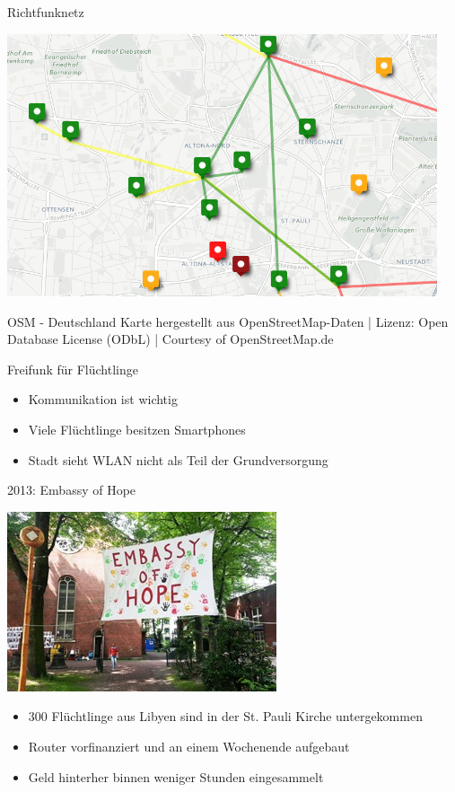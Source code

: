 \documentclass[t]{beamer}
\begin{document}
  \begin{frame}{Richtfunknetz}
    \begin{center}
      \includegraphics[width=0.95\textwidth]{Bilder/richtfunk-uebersicht}
    \end{center}
    \tiny{OSM - Deutschland Karte hergestellt aus OpenStreetMap-Daten | Lizenz: Open Database License (ODbL) | Courtesy of OpenStreetMap.de}
  \end{frame}
  
  \begin{frame}{Freifunk für Flüchtlinge}
    \begin{itemize}
      \item Kommunikation ist wichtig
      \item Viele Flüchtlinge besitzen Smartphones
      \item Stadt sieht WLAN nicht als Teil der Grundversorgung
    \end{itemize}
  \end{frame}
  
  \begin{frame}{2013: Embassy of Hope}
    \begin{center}
      \includegraphics[width=.4\textwidth]{Bilder/embassyofhope.jpg} 
    \end{center}
    \begin{itemize}
      \item 300 Flüchtlinge aus Libyen sind in der St. Pauli Kirche untergekommen
      \item Router vorfinanziert und an einem Wochenende aufgebaut
      \item Geld hinterher binnen weniger Stunden eingesammelt
    \end{itemize}
  \end{frame}
  
\end{document}
